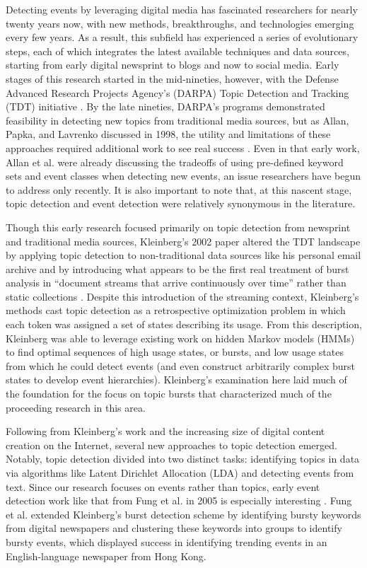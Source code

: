 \documentclass{acm_proc_article-sp}
\begin{document}
Detecting events by leveraging digital media has fascinated researchers for nearly twenty years now, with new methods, breakthroughs, and technologies emerging every few years.
As a result, this subfield has experienced a series of evolutionary steps, each of which integrates the latest available techniques and data sources, starting from early digital newsprint to blogs and now to social media.
Early stages of this research started in the mid-nineties, however, with the Defense Advanced Research Projects Agency's (DARPA) Topic Detection and Tracking (TDT) initiative \cite{Allan98topicdetection}.
By the late nineties, DARPA's programs demonstrated feasibility in detecting new topics from traditional media sources, but as Allan, Papka, and Lavrenko discussed in 1998, the utility and limitations of these approaches required additional work to see real success \cite{allan1998line}.
Even in that early work, Allan et al. were already discussing the tradeoffs of using pre-defined keyword sets and event classes when detecting new events, an issue researchers have begun to address only recently.
It is also important to note that, at this nascent stage, topic detection and event detection were relatively synonymous in the literature.

Though this early research focused primarily on topic detection from newsprint and traditional media sources, Kleinberg's 2002 paper altered the TDT landscape by applying topic detection to non-traditional data sources like his personal email archive and by introducing what appears to be the first real treatment of burst analysis in ``document streams that arrive continuously over time'' rather than  static collections \cite{Kleinberg:2002:BHS:775047.775061}. 
Despite this introduction of the streaming context, Kleinberg's methods cast topic detection as a retrospective optimization problem in which each token was assigned a set of states describing its usage.
From this description, Kleinberg was able to leverage existing work on hidden Markov models (HMMs) to find optimal sequences of high usage states, or bursts, and low usage states from which he could detect events (and even construct arbitrarily complex burst states to develop event hierarchies).
Kleinberg's examination here laid much of the foundation for the focus on topic bursts that characterized much of the proceeding research in this area.

Following from Kleinberg's work and the increasing size of digital content creation on the Internet, several new approaches to topic detection emerged.
Notably, topic detection divided into two distinct tasks: identifying topics in data via algorithms like Latent Dirichlet Allocation (LDA) \cite{blei2003latent} and detecting events from text.
Since our research focuses on events rather than topics, early event detection work like that from Fung et al. in 2005 is especially interesting \cite{Fung:2005:PFB:1083592.1083616}.
Fung et al. extended Kleinberg's burst detection scheme by identifying bursty keywords from digital newspapers and clustering these keywords into groups to identify bursty events, which displayed success in identifying trending events in an English-language newspaper from Hong Kong.
\end{document}

